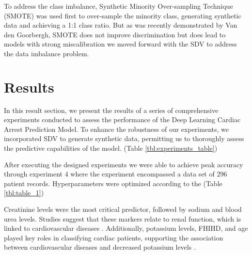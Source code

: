 \documentclass[journal,article,submit,pdftex,moreauthors]{Definitions/mdpi}
\begin{document}
To address the class imbalance, Synthetic Minority Over-sampling Technique (SMOTE) was used first to over-sample the minority class, generating synthetic data and achieving a 1:1 class ratio. But as was recently demonstrated by Van den Goorbergh, SMOTE does not improve discrimination but does lead to models with strong miscalibration \cite{a23} we moved forward with the SDV to address the data imbalance problem.  

\section{Results}
In this result section, we present the results of a series of comprehensive experiments conducted to assess the performance of the Deep Learning Cardiac Arrest Prediction Model. To enhance the robustness of our experiments, we incorporated SDV to generate synthetic data, permitting us to thoroughly assess the predictive capabilities of the model.
(Table \ref{tbl:experiments_table})


After executing the designed experiments we were able to achieve peak accuracy through experiment 4 where the experiment encompassed a data set of 296 patient records. Hyperparameters were optimized according to the (Table \ref{tbl:table_1})

\begin{table}[hbt!]
\caption{Hyperparameter values}
\begin{center}
\label{tab1}
\end{center}
\vspace{-20pt}
\label{tbl:table_1}
\end{table}

Creatinine levels were the most critical predictor, followed by sodium and blood urea levels. Studies suggest that these markers relate to renal function, which is linked to cardiovascular diseases \cite{b22}. Additionally, potassium levels, FHIHD, and age played key roles in classifying cardiac patients, supporting the association between cardiovascular diseases and decreased potassium levels \cite{b23}.
\end{document}

